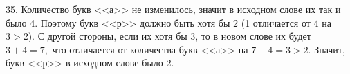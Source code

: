 35. Количество букв <<а>> не изменилось, значит в исходном слове их так и было 4. Поэтому букв <<р>> должно быть хотя бы 2 (1 отличается от 4 на $3>2$). С другой стороны, если их хотя бы 3, то в новом слове их будет $3+4=7,$ что отличается от количества букв <<а>> на $7-4=3>2.$ Значит, букв <<р>> в исходном слове было 2.\\
